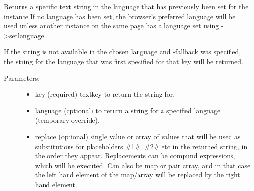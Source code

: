 \documentclass[letterpaper,10pt,english]{sphinxmanual}
\begin{document}
\begin{fulllineitems}
\begin{fulllineitems}
\end{fulllineitems}


\begin{fulllineitems}
\label{knop_lang:knop_lang.getstring}
\end{fulllineitems}


\begin{fulllineitems}
Returns a specific text string in the language that has previously been set for
the instance.If no language has been set, the browser's preferred language will
be used unless another instance on the same page has a language set using
-\textgreater{}setlanguage.

If the string is not available in the chosen language and -fallback was
specified, the string for the language that was first specified for that key
will be returned.
\begin{description}
\item[{Parameters:}] \leavevmode\begin{itemize}
\item {} 
key (required)
textkey to return the string for.

\item {} 
language (optional)
to return a string for a specified language (temporary override).

\item {} 
replace (optional)
single value or array of values that will be used as substitutions for placeholders \#1\#, \#2\# etc in the returned string, in the order they appear. Replacements can be compund expressions, which will be executed. Can also be map or pair array, and in that case the left hand element of the map/array will be replaced by the right hand element.

\end{itemize}

\end{description}

\end{fulllineitems}


\end{fulllineitems}
\end{document}
